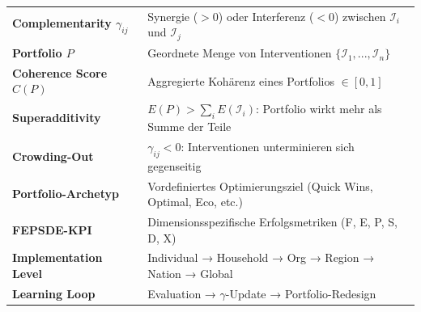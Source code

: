 \begin{tcolorbox}[colback=blue!5!white, colframe=blue!75!black,
    title=Zentrale Begriffe in diesem Kapitel]
\small
\begin{tabular}{@{}ll@{}}
\textbf{Complementarity $\gamma_{ij}$} & Synergie ($>0$) oder Interferenz ($<0$) zwischen $\mathcal{I}_i$ und $\mathcal{I}_j$ \\
\textbf{Portfolio $P$} & Geordnete Menge von Interventionen $\{\mathcal{I}_1, ..., \mathcal{I}_n\}$ \\
\textbf{Coherence Score $C(P)$} & Aggregierte Kohärenz eines Portfolios $\in [0, 1]$ \\
\textbf{Superadditivity} & $E(P) > \sum_i E(\mathcal{I}_i)$: Portfolio wirkt mehr als Summe der Teile \\
\textbf{Crowding-Out} & $\gamma_{ij} < 0$: Interventionen unterminieren sich gegenseitig \\
\textbf{Portfolio-Archetyp} & Vordefiniertes Optimierungsziel (Quick Wins, Optimal, Eco, etc.) \\
\textbf{FEPSDE-KPI} & Dimensionsspezifische Erfolgsmetriken (F, E, P, S, D, X) \\
\textbf{Implementation Level} & Individual → Household → Org → Region → Nation → Global \\
\textbf{Learning Loop} & Evaluation → $\gamma$-Update → Portfolio-Redesign \\
\end{tabular}
\end{tcolorbox}

